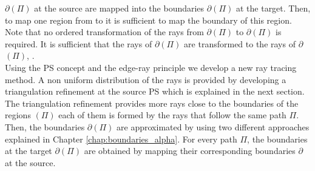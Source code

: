 $\partial$$(\Pi)$ at the source are mapped into the boundaries $\partial$$(\Pi)$ at the target.
Then, to map one region from  to  it is sufficient to map the boundary of this region. 
Note that no ordered transformation of the rays from $\partial$$(\Pi)$ to $\partial$$(\Pi)$ is required. 
It is sufficient that the rays of  $\partial$$(\Pi)$ are transformed to the rays of $\partial$$(\Pi)$, \cite{minano1992new}. 
\\ \indent Using the PS concept and the edge-ray principle we develop a new ray tracing method. 
A non uniform distribution of the rays is provided by developing a triangulation refinement at the source PS which is explained in the next section. 
The triangulation refinement provides more rays close to the boundaries of the regions $(\Pi)$ each of them is formed by the rays that follow the same path $\Pi$.
Then, the boundaries $\partial$$(\Pi)$ are approximated by using two different approaches explained in Chapter \ref{chap:boundaries_alpha}. For every path $\Pi$, the boundaries at the target $\partial$$(\Pi)$ are obtained by mapping their corresponding boundaries $\partial$ at the source.
